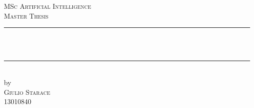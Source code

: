 \documentclass[../main.tex]{subfiles}
\begin{document}
\begin{titlepage}

	\newcommand{\HRule}{\rule{\linewidth}{0.5mm}} %

	\center %






	\textsc{\Large MSc Artificial Intelligence}\\[0.2cm]

	\textsc{\Large Master Thesis}\\[0.5cm]








	\HRule \\[0.4cm]

	{ \huge \bfseries {}}\\[0.4cm] %

	\HRule \\[0.5cm]








	by\\[0.2cm]

	\textsc{\Large Giulio Starace}\\[0.2cm] %

	13010840\\[1cm]







\end{titlepage}
\end{document}
